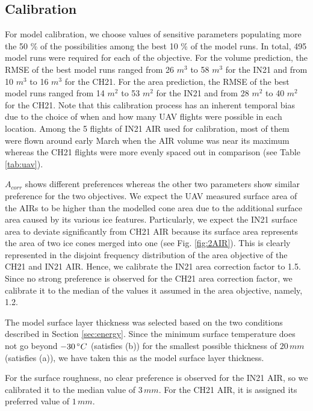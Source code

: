 \documentclass[utf8]{frontiersSCNS} %
\begin{document}
\subsection{Calibration}

For model calibration, we choose values of sensitive parameters populating more the 50 \% of the possibilities
among the best 10 \% of the model runs. In total, 495 model runs were required for each of the objective.
For the volume prediction, the RMSE of the best model runs ranged from 26 $m^3$ to 58 $m^3$ for the IN21 and from
10 $m^3$ to 16 $m^3$ for the CH21. For the area prediction, the RMSE of the best model runs ranged from 14 $m^2$ to
53 $m^2$ for the IN21 and from 28 $m^2$ to 40 $m^2$ for the CH21. Note that this calibration process has an
inherent temporal bias due to the choice of when and how many UAV flights were possible in each location. Among
the 5 flights of IN21 AIR used for calibration, most of them were flown around early March when the AIR volume was
near its maximum whereas the CH21 flights were more evenly spaced out in comparison (see Table \ref{tab:uav}).

$A_{corr}$ shows different preferences whereas the other two parameters show similar preference for the two
objectives. We expect the UAV measured surface area of the AIRs to be higher than the modelled cone area due to the
additional surface area caused by its various ice features. Particularly, we expect the IN21 surface area to
deviate significantly from CH21 AIR because its surface area represents the area of two ice cones merged into one
(see Fig.  \ref{fig:2AIR}). This is clearly represented in the disjoint frequency distribution of the area
objective of the CH21 and IN21 AIR. Hence, we calibrate the IN21 area correction factor to 1.5. Since no strong
preference is observed for the CH21 area correction factor, we calibrate it to the median of the values it assumed
in the area objective, namely, 1.2.

The model surface layer thickness was selected based on the two conditions described in Section \ref{sec:energy}.
Since the minimum surface temperature does not go beyond $-30 \, \degree C$ (satisfies (b)) for the smallest
possible thickness of $20\, mm$ (satisfies (a)), we have taken this as the model surface layer thickness.

For the surface roughness, no clear preference is observed for the IN21 AIR, so we calibrated it to the median
value of $3 \, mm$. For the CH21 AIR, it is assigned its preferred value of $1 \, mm$.
\end{document}

